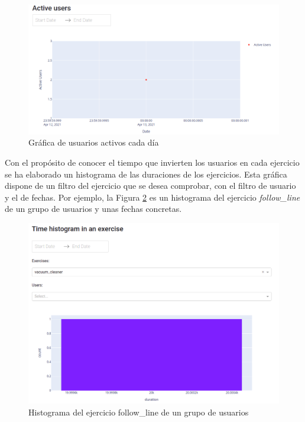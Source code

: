 \begin{figure}[H]
    \centering
    \includegraphics[width=17cm, keepaspectratio]{img/active.png}
    \caption{Gráfica de usuarios activos cada día}
    \label{fig:active}
\end{figure}
\newpage
Con el propósito de conocer el tiempo que invierten los usuarios en cada ejercicio se ha elaborado un histograma de las duraciones de los ejercicios. Esta gráfica dispone de un filtro del ejercicio que se desea comprobar, con el filtro de usuario y el de fechas. Por ejemplo, la Figura \ref{fig:histogram_exercise} es un histograma del ejercicio \textit{follow\_line}  de un grupo de usuarios y unas fechas concretas.
\begin{figure}[H]
    \centering
    \includegraphics[width=17cm, keepaspectratio]{img/histogram_exercise.png}
    \caption{Histograma del ejercicio follow\_line de un grupo de usuarios }
    \label{fig:histogram_exercise}
\end{figure}
\newpage

